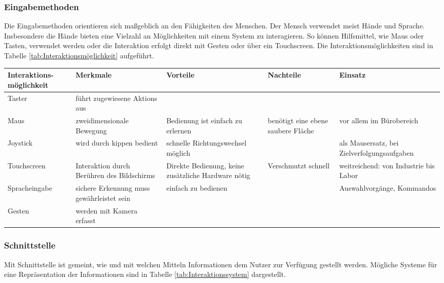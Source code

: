 \subsubsection*{Eingabemethoden}
Die Eingabemethoden orientieren sich maßgeblich an den Fähigkeiten des Menschen. Der Mensch verwendet meist Hände und Sprache. Insbesondere die Hände bieten eine Vielzahl an Möglichkeiten mit einem System zu interagieren. So können Hilfsmittel, wie Maus oder Tasten, verwendet werden oder die Interaktion erfolgt direkt mit Gesten oder über ein Touchscreen. Die Interaktionsmöglichkeiten sind in Tabelle \ref{tab:Interaktionsmöglichkeit} aufgeführt. \cite{Zuhlke2012}

\begin{sidewaystable}[ph!]
\begin{tabular}{p{3cm}|p{4cm}|p{4cm}|p{3cm}|p{3cm}}
	\textbf{Interaktions-möglichkeit} & \textbf{Merkmale} & \textbf{Vorteile} & \textbf{Nachteile} & \textbf{Einsatz} \\
	\hline
	Taster & führt zugewiesene Aktions aus & & & \\
	\hline
	Maus & zweidimensionale Bewegung & Bedienung ist einfach zu erlernen & benötigt eine ebene saubere Fläche & vor allem im Bürobereich\\
	\hline
	Joystick & wird durch kippen bedient & schnelle Richtungswechsel möglich & & als Mausersatz, bei Zielverfolgungsaufgaben \\
	\hline
	Touchscreen & Interaktion durch Berühren des Bildschirms & Direkte Bedienung, keine zusätzliche Hardware nötig & Verschmutzt schnell & weitreichend: von Industrie bis Labor \\
	\hline
	Spracheingabe & sichere Erkennung muss gewährleistet sein & einfach zu bedienen & & Auswahlvorgänge, Kommandos \\
	\hline
	Gesten & werden mit Kamera erfasst & & & \\
	\hline
\end{tabular}
\caption{Interaktionsmöglichkeiten mit einem Assistenzsystem}
\label{tab:Interaktionsmöglichkeit}
\end{sidewaystable}

\subsubsection*{Schnittstelle}
Mit Schnittstelle ist gemeint, wie und mit welchen Mitteln Informationen dem Nutzer zur Verfügung gestellt werden. Mögliche Systeme für eine Repräsentation der Informationen sind in Tabelle \ref{tab:Interaktionssystem} dargestellt. \cite{Zuhlke2012, Kasselmann2016, Weidner2016}

